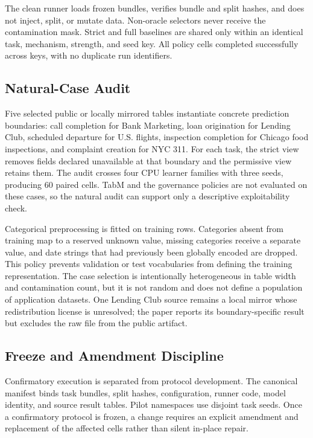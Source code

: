 \documentclass[sigconf,review]{acmart}
\begin{document}
The clean runner loads frozen bundles, verifies bundle and split hashes, and
does not inject, split, or mutate data. Non-oracle selectors never receive the
contamination mask. Strict and full baselines are shared only within an
identical task, mechanism, strength, and seed key. All \GovernanceCellCount{} policy
cells completed successfully across \GovernanceKeyCount{} keys, with no
duplicate run identifiers.

\subsection{Natural-Case Audit}

Five selected public or locally mirrored tables instantiate concrete prediction
boundaries: call completion for Bank Marketing, loan origination for Lending
Club, scheduled departure for U.S. flights, inspection completion for Chicago
food inspections, and complaint creation for NYC 311. For each task, the
strict view removes fields declared unavailable at that boundary and the
permissive view retains them. The audit crosses four CPU learner families with
three seeds, producing 60 paired cells. TabM and the governance policies are
not evaluated on these cases, so the natural audit can support only a
descriptive exploitability check.

Categorical preprocessing is fitted on training rows. Categories absent from
training map to a reserved unknown value, missing categories receive a separate
value, and date strings that had previously been globally encoded are dropped.
This policy prevents validation or test vocabularies from defining the
training representation. The case selection is intentionally heterogeneous in
table width and contamination count, but it is not random and does not define
a population of application datasets. One Lending Club source remains a local
mirror whose redistribution license is unresolved; the paper reports its
boundary-specific result but excludes the raw file from the public artifact.

\subsection{Freeze and Amendment Discipline}

Confirmatory execution is separated from protocol development. The canonical
manifest binds task bundles, split hashes, configuration, runner code, model
identity, and source result tables. Pilot namespaces use disjoint task seeds.
Once a confirmatory protocol is frozen, a change requires an explicit amendment
and replacement of the affected cells rather than silent in-place repair.
\end{document}

